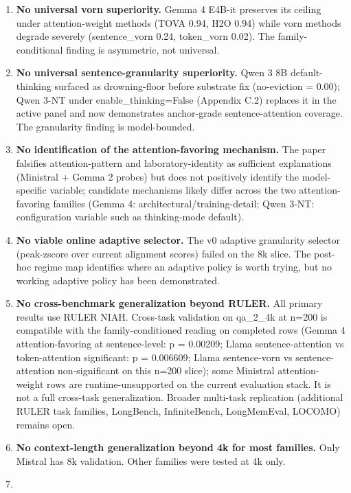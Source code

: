 \documentclass[
]{article}
\begin{document}
\begin{enumerate}
\def\labelenumi{\arabic{enumi}.}
\item
  \textbf{No universal vorn superiority.} Gemma 4 E4B-it
  preserves its ceiling under attention-weight methods (TOVA 0.94,
  H2O 0.94) while vorn methods degrade severely
  (sentence\_vorn 0.24, token\_vorn 0.02). The family-conditional
  finding is asymmetric, not universal.
\item
  \textbf{No universal sentence-granularity superiority.} Qwen 3 8B
  default-thinking surfaced as drowning-floor before substrate fix
  (no-eviction = 0.00); Qwen 3-NT under enable\_thinking=False
  (Appendix C.2) replaces it in the active panel and now demonstrates
  anchor-grade sentence-attention coverage. The granularity finding
  is model-bounded.
\item
  \textbf{No identification of the attention-favoring mechanism.} The
  paper falsifies attention-pattern and laboratory-identity as
  sufficient explanations (Ministral + Gemma 2 probes) but does not
  positively identify the model-specific variable; candidate mechanisms
  likely differ across the two attention-favoring families (Gemma 4:
  architectural/training-detail; Qwen 3-NT: configuration variable
  such as thinking-mode default).
\item
  \textbf{No viable online adaptive selector.} The v0 adaptive
  granularity selector (peak-zscore over current alignment scores)
  failed on the 8k slice. The post-hoc regime map identifies where an
  adaptive policy is worth trying, but no working adaptive policy has
  been demonstrated.
\item
  \textbf{No cross-benchmark generalization beyond RULER.} All primary
  results use RULER NIAH. Cross-task validation on qa\_2\_4k at n=200
  is compatible with the family-conditioned reading on completed rows
  (Gemma 4 attention-favoring at sentence-level: p = 0.00209;
  Llama sentence-attention vs token-attention significant: p =
  0.006609; Llama sentence-vorn vs sentence-attention non-significant
  on this n=200 slice); some Ministral attention-weight rows are
  runtime-unsupported on the current evaluation stack. It is not a
  full cross-task generalization. Broader multi-task replication
  (additional RULER task families, LongBench, InfiniteBench,
  LongMemEval, LOCOMO) remains open.
\item
  \textbf{No context-length generalization beyond 4k for most families.}
  Only Mistral has 8k validation. Other families were tested at 4k only.
\item

\end{enumerate}
\end{document}

